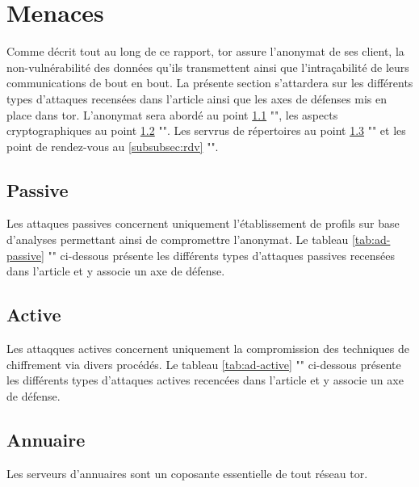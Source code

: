 \section{Menaces}\label{sec:ad}

Comme décrit tout au long de ce rapport, \acrshort{tor} assure l'anonymat de ses client, la non-vulnérabilité des données qu'ils transmettent ainsi que l'intraçabilité de leurs communications de bout en bout. 
La présente section s'attardera sur les différents types d'attaques recensées dans l'article ainsi que les axes de défenses mis en place dans \acrshort{tor}.
L'anonymat sera abordé au point \ref{subsubsec:passive} "", les aspects cryptographiques au point \ref{subsubsec:active} "".
Les servrus de répertoires au point \ref{subsubsec:annuaire} "" et les point de rendez-vous au \ref{subsubsec:rdv} "".

\subsection{Passive}\label{subsubsec:passive}

Les attaques passives concernent uniquement l'établissement de profils sur base d'analyses permettant ainsi de compromettre l'anonymat. 
Le tableau \ref{tab:ad-passive} "" ci-dessous présente les différents types d'attaques passives recensées dans l'article et y associe un axe de défense.


\newpage
\subsection{Active}\label{subsubsec:active}

Les attaqques actives concernent uniquement la compromission des techniques de chiffrement via divers procédés. 
Le tableau \ref{tab:ad-active} "" ci-dessous présente les différents types d'attaques actives recencées dans l'article et y associe un axe de défense.


\newpage
\subsection{Annuaire}\label{subsubsec:annuaire}
Les serveurs d'annuaires sont un coposante essentielle de tout réseau \acrshort{tor}.
% 

